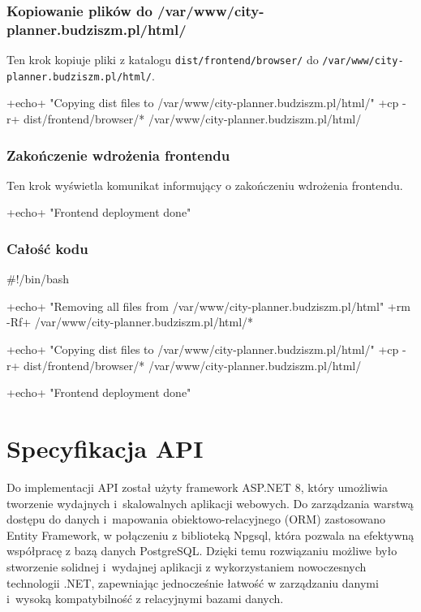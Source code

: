 \subsubsection{Kopiowanie plików do /var/www/city-planner.budziszm.pl/html/}
Ten krok kopiuje pliki z katalogu \texttt{dist/frontend/browser/} \newline
do \texttt{/var/www/city-planner.budziszm.pl/html/}.
\begin{longlisting}[style=shell-colored]
+echo+ "Copying dist files to /var/www/city-planner.budziszm.pl/html/"
+cp -r+ dist/frontend/browser/* /var/www/city-planner.budziszm.pl/html/
\end{longlisting}

\subsubsection{Zakończenie wdrożenia frontendu}
Ten krok wyświetla komunikat informujący o zakończeniu wdrożenia frontendu.
\begin{longlisting}[style=shell-colored]
+echo+ "Frontend deployment done"
\end{longlisting}

\subsubsection{Całość kodu}
\begin{longlisting}[style=shell-colored]
#!/bin/bash

+echo+ "Removing all files from /var/www/city-planner.budziszm.pl/html"
+rm -Rf+ /var/www/city-planner.budziszm.pl/html/*

+echo+ "Copying dist files to /var/www/city-planner.budziszm.pl/html/"
+cp -r+ dist/frontend/browser/* /var/www/city-planner.budziszm.pl/html/

+echo+ "Frontend deployment done"
\end{longlisting}

\section{Specyfikacja API}
Do implementacji API został użyty framework ASP.NET 8, który umożliwia tworzenie wydajnych i~skalowalnych aplikacji webowych. Do zarządzania warstwą dostępu do danych i~mapowania obiektowo-relacyjnego (ORM) zastosowano Entity Framework, w połączeniu z biblioteką Npgsql, która pozwala na efektywną współpracę z bazą danych PostgreSQL\@.
Dzięki temu rozwiązaniu możliwe było stworzenie solidnej i~wydajnej aplikacji z wykorzystaniem nowoczesnych technologii .NET, zapewniając jednocześnie łatwość w zarządzaniu danymi i~wysoką kompatybilność z relacyjnymi bazami danych.

